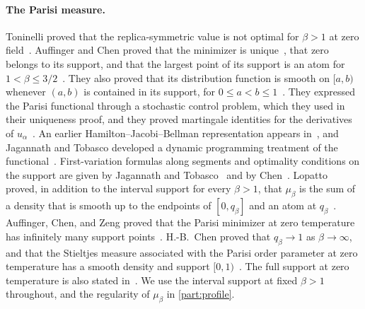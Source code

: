 \paragraph{The Parisi measure.}
Toninelli proved that the replica-symmetric value is not optimal for
$\beta>1$ at zero field~\cite{Toninelli2002}. Auffinger and Chen proved
that the minimizer is unique~\cite{AuffingerChen2015Uniqueness}, that
zero belongs to its support, and that the largest point of its support
is an atom for $1<\beta\le3/2$~\cite[Theorems~1
and~4]{AuffingerChen2015Properties}. They also proved that its
distribution function is smooth on $[a,b)$ whenever $(a,b)$ is
contained in its support, for $0\le a<b\le1$~\cite[Theorem~2]{AuffingerChen2015Properties}.
They expressed the Parisi functional through a stochastic control
problem, which they used in their uniqueness proof, and they proved
martingale identities for the derivatives of
$u_\alpha$~\cite[Theorem~3 and Lemma~2]{AuffingerChen2015Uniqueness}. An earlier
Hamilton--Jacobi--Bellman representation appears
in~\cite[Section~6.2]{BovierKlimovsky2009}, and Jagannath and Tobasco
developed a dynamic programming treatment of the
functional~\cite[Lemma~18]{JagannathTobasco2016}. First-variation
formulas along segments and optimality conditions on the support are
given by Jagannath and Tobasco~\cite[Lemma~3.2 and
Proposition~1.1]{JagannathTobasco2017PhaseDiagram} and by
Chen~\cite[Theorem~2 and Proposition~1]{Chen2017Variational}. Lopatto
proved, in addition to the interval support for every $\beta>1$, that
$\mu_\beta$ is the sum of a density that is smooth up to the endpoints
of $[0,q_\beta]$ and an atom at $q_\beta$~\cite[Theorem~1.1]{Lopatto}.
Auffinger, Chen, and Zeng proved that the Parisi
minimizer at zero temperature has infinitely many support
points~\cite{AuffingerChenZeng2020}. H.-B.~Chen proved that
$q_\beta\to1$ as $\beta\to\infty$, and that the Stieltjes measure
associated with the Parisi order parameter at zero temperature has a
smooth density and support
$[0,1)$~\cite[Theorems~1.2 and~1.3]{Chen2026ZeroTemperatureSupport}. The
full support at zero temperature is also stated
in~\cite[Theorem~1.1]{OpenAIFullSupport}. We use the interval support
at fixed $\beta>1$ throughout, and the regularity of $\mu_\beta$ in
\cref{part:profile}.

